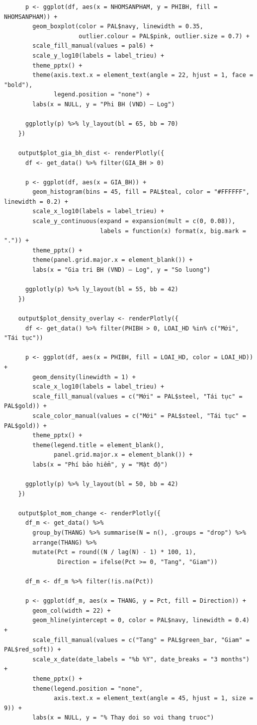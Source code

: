 \documentclass[12pt, a4paper]{article}
\begin{document}
\begin{lstlisting}
      p <- ggplot(df, aes(x = NHOMSANPHAM, y = PHIBH, fill = NHOMSANPHAM)) +
        geom_boxplot(color = PAL$navy, linewidth = 0.35,
                     outlier.colour = PAL$pink, outlier.size = 0.7) +
        scale_fill_manual(values = pal6) +
        scale_y_log10(labels = label_trieu) +
        theme_pptx() +
        theme(axis.text.x = element_text(angle = 22, hjust = 1, face = "bold"),
              legend.position = "none") +
        labs(x = NULL, y = "Phi BH (VND) — Log")

      ggplotly(p) %>% ly_layout(bl = 65, bb = 70)
    })

    output$plot_gia_bh_dist <- renderPlotly({
      df <- get_data() %>% filter(GIA_BH > 0)

      p <- ggplot(df, aes(x = GIA_BH)) +
        geom_histogram(bins = 45, fill = PAL$teal, color = "#FFFFFF", linewidth = 0.2) +
        scale_x_log10(labels = label_trieu) +
        scale_y_continuous(expand = expansion(mult = c(0, 0.08)),
                           labels = function(x) format(x, big.mark = ".")) +
        theme_pptx() +
        theme(panel.grid.major.x = element_blank()) +
        labs(x = "Gia tri BH (VND) — Log", y = "So luong")

      ggplotly(p) %>% ly_layout(bl = 55, bb = 42)
    })

    output$plot_density_overlay <- renderPlotly({
      df <- get_data() %>% filter(PHIBH > 0, LOAI_HD %in% c("Mới", "Tái tục"))

      p <- ggplot(df, aes(x = PHIBH, fill = LOAI_HD, color = LOAI_HD)) +
        geom_density(linewidth = 1) +
        scale_x_log10(labels = label_trieu) +
        scale_fill_manual(values = c("Mới" = PAL$steel, "Tái tục" = PAL$gold)) +
        scale_color_manual(values = c("Mới" = PAL$steel, "Tái tục" = PAL$gold)) +
        theme_pptx() +
        theme(legend.title = element_blank(),
              panel.grid.major.x = element_blank()) +
        labs(x = "Phí bảo hiểm", y = "Mật độ")

      ggplotly(p) %>% ly_layout(bl = 50, bb = 42)
    })

    output$plot_mom_change <- renderPlotly({
      df_m <- get_data() %>%
        group_by(THANG) %>% summarise(N = n(), .groups = "drop") %>%
        arrange(THANG) %>%
        mutate(Pct = round((N / lag(N) - 1) * 100, 1),
               Direction = ifelse(Pct >= 0, "Tang", "Giam"))

      df_m <- df_m %>% filter(!is.na(Pct))

      p <- ggplot(df_m, aes(x = THANG, y = Pct, fill = Direction)) +
        geom_col(width = 22) +
        geom_hline(yintercept = 0, color = PAL$navy, linewidth = 0.4) +
        scale_fill_manual(values = c("Tang" = PAL$green_bar, "Giam" = PAL$red_soft)) +
        scale_x_date(date_labels = "%b %Y", date_breaks = "3 months") +
        theme_pptx() +
        theme(legend.position = "none",
              axis.text.x = element_text(angle = 45, hjust = 1, size = 9)) +
        labs(x = NULL, y = "% Thay doi so voi thang truoc")


\end{lstlisting}
\end{document}
